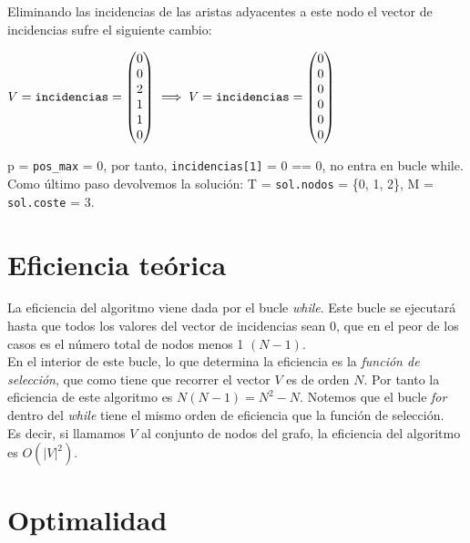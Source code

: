 \documentclass[11pt]{article}
\begin{document}
Eliminando las incidencias de las aristas adyacentes a este nodo el vector de incidencias sufre el siguiente cambio:

\vspace{1em}

 $\displaystyle V = \verb|incidencias| =
\begin{pmatrix}
	0 \\
	0 \\
	2 \\
	1 \\
	1 \\
	0
\end{pmatrix} \implies V = \verb|incidencias| =
\begin{pmatrix}
	0 \\
	0 \\
	0 \\
	0 \\
	0 \\
	0
\end{pmatrix}$

\vspace{1em}

 p = \verb|pos_max| = 0, por tanto, \verb|incidencias[1]| = 0 == 0, no entra en bucle while. Como último paso devolvemos la solución:  T  = \verb|sol.nodos| = \{0, 1, 2\}, M = \verb|sol.coste| = 3.

\section*{Eficiencia teórica}
La eficiencia del algoritmo viene dada por el bucle \textit{while}. Este bucle se ejecutará hasta que todos los valores del vector de incidencias sean $0$, que en el peor de los casos es el número total de nodos menos 1 $(N - 1)$.\\

En el interior de este bucle, lo que determina la eficiencia es la \textit{función de selección}, que como tiene que recorrer el vector $V$ es de orden $N$. Por tanto la eficiencia de este algoritmo es $N(N-1) = N^2 - N$. Notemos que el bucle \textit{for} dentro del \textit{while} tiene el mismo orden de eficiencia que la función de selección.\\

Es decir, si llamamos $V$ al conjunto de nodos del grafo, la eficiencia del algoritmo es $O(|V|^2)$.

\section*{Optimalidad}
\end{document}

